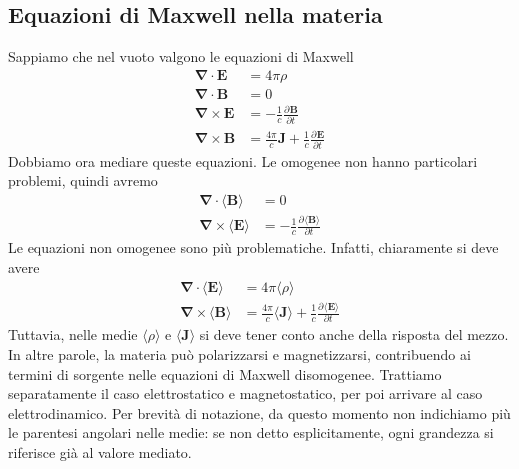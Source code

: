 \documentclass[a4paper,11pt]{book}
\newcommand{\der}[3][]{\frac{\partial ^{#1}#2}{\partial {#3}^{#1}}}
\let\oldnabla\nabla
\renewcommand{\nabla}{\vec{\oldnabla}}
\renewcommand{\vec}[1]{\mathbf{#1}}
\theoremstyle{theorem}
\theoremstyle{definition}
\begin{document}
 \subsection{Equazioni di Maxwell nella materia}
 Sappiamo che nel vuoto valgono le equazioni di Maxwell
 \begin{align*}
 \nabla\cdot\vec{E}&=4\pi\rho\\\nabla\cdot\vec{B}&=0\\\nabla\times\vec{E}&=-\frac{1}{c}\der{\vec{B}}{t}\\\nabla\times\vec{B}&=\frac{4\pi}{c}\vec{J}+\frac{1}{c}\der{\vec{E}}{t}\end{align*}
 Dobbiamo ora mediare queste equazioni. Le omogenee non hanno particolari problemi, quindi avremo
 \begin{align*}
 	\nabla\cdot\langle\vec{B}\rangle&=0\\\nabla\times\langle\vec{E}\rangle&=-\frac{1}{c}\der{\langle\vec{B}\rangle}{t}
 \end{align*}
 Le equazioni non omogenee sono più problematiche. Infatti, chiaramente si deve avere
 \begin{align*}
 \nabla\cdot\langle\vec{E}\rangle&=4\pi\langle\rho\rangle\\\nabla\times\langle\vec{B}\rangle&=\frac{4\pi}{c}\langle\vec{J}\rangle+\frac{1}{c}\der{\langle\vec{E}\rangle}{t}\end{align*}
 Tuttavia, nelle medie $\langle\rho\rangle$ e $\langle\vec{J}\rangle$ si deve tener conto anche della risposta del mezzo. In altre parole, la materia può polarizzarsi e magnetizzarsi, contribuendo ai termini di sorgente nelle equazioni di Maxwell disomogenee. Trattiamo separatamente il caso elettrostatico e magnetostatico, per poi arrivare al caso elettrodinamico. Per brevità di notazione, da questo momento non indichiamo più le parentesi angolari nelle medie: se non detto esplicitamente, ogni grandezza si riferisce già al valore mediato.
\end{document}
